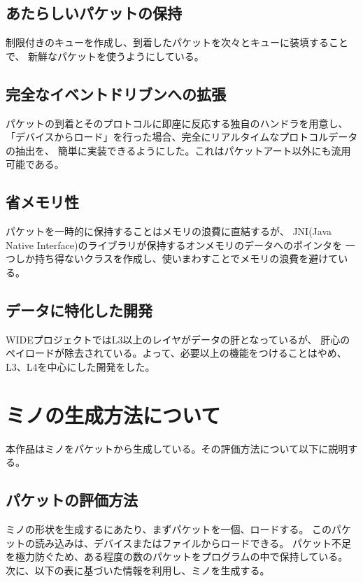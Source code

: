 \documentclass[11pt,a4paper]{jsarticle}
\begin{document}
\subsection{あたらしいパケットの保持}
制限付きのキューを作成し、到着したパケットを次々とキューに装填することで、
 新鮮なパケットを使うようにしている。

\subsection{完全なイベントドリブンへの拡張}
パケットの到着とそのプロトコルに即座に反応する独自のハンドラを用意し、
「デバイスからロード」を行った場合、完全にリアルタイムなプロトコルデータの抽出を、 簡単に実装できるようにした。これはパケットアート以外にも流用可能である。

\subsection{省メモリ性}
パケットを一時的に保持することはメモリの浪費に直結するが、
JNI(Java Native Interface)のライブラリが保持するオンメモリのデータへのポインタを
 一つしか持ち得ないクラスを作成し、使いまわすことでメモリの浪費を避けている。

\subsection{データに特化した開発}
WIDEプロジェクトではL3以上のレイヤがデータの肝となっているが、
 肝心のペイロードが除去されている。よって、必要以上の機能をつけることはやめ、
L3、L4を中心にした開発をした。


\section{ミノの生成方法について}
本作品はミノをパケットから生成している。その評価方法について以下に説明する。

\subsection{パケットの評価方法}
ミノの形状を生成するにあたり、まずパケットを一個、ロードする。
このパケットの読み込みは、デバイスまたはファイルからロードできる。
パケット不足を極力防ぐため、ある程度の数のパケットをプログラムの中で保持している。
次に、以下の表に基づいた情報を利用し、ミノを生成する。
\end{document}
